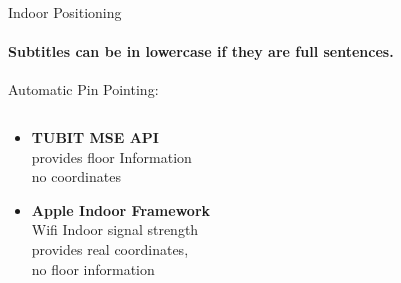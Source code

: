 \documentclass[11pt]{beamer}
\begin{document}
\begin{frame}{Indoor Positioning}

\framesubtitle{Subtitles can be in lowercase if they are full sentences.}
Automatic Pin Pointing:

  \begin{columns}[T]
  \begin{column}{.6\textwidth}
  \begin{itemize}
  \item  \textbf{TUBIT MSE API} \\
provides floor Information \\
no coordinates

  \item \textbf{Apple Indoor Framework} \\
Wifi Indoor signal strength \\
provides real coordinates, \\
no floor information \\




\end{itemize}
\end{column}
\end{columns}
\end{frame}
\end{document}
